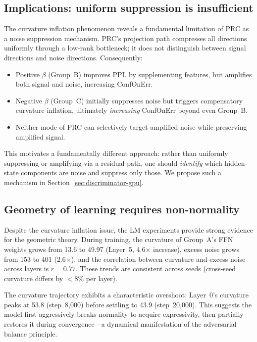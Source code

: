\documentclass[11pt,a4paper]{article}
\theoremstyle{definition}
\begin{document}
\subsection{Implications: uniform suppression is insufficient}

The curvature inflation phenomenon reveals a fundamental
limitation of PRC as a noise suppression mechanism. PRC's
projection path compresses all directions uniformly through a
low-rank bottleneck; it does not distinguish between signal
directions and noise directions. Consequently:
\begin{itemize}[nosep]
  \item Positive $\beta$ (Group~B) improves PPL by supplementing
        features, but amplifies both signal and noise, increasing
        ConfOnErr.
  \item Negative $\beta$ (Group~C) initially suppresses noise but
        triggers compensatory curvature inflation, ultimately
        \emph{increasing} ConfOnErr beyond even Group~B.
  \item Neither mode of PRC can selectively target amplified
        noise while preserving amplified signal.
\end{itemize}

This motivates a fundamentally different approach: rather than
uniformly suppressing or amplifying via a residual path, one
should \emph{identify} which hidden-state components are noise
and suppress only those. We propose such a mechanism in
Section~\ref{sec:discriminator-gpu}.

\subsection{Geometry of learning requires non-normality}

Despite the curvature inflation issue, the LM experiments provide
strong evidence for the geometric theory. During training, the
curvature of Group~A's FFN weights grows from 13.6 to 49.97
(Layer~5, 4.6$\times$ increase), excess noise grows from 153 to
401 (2.6$\times$), and the correlation between curvature and
excess noise across layers is $r = 0.77$. These trends are
consistent across seeds (cross-seed curvature differs by
$<8\%$ per layer).

The curvature trajectory exhibits a characteristic overshoot:
Layer~0's curvature peaks at 53.8 (step~8{,}000) before settling
to 43.9 (step~20{,}000). This suggests the model first
aggressively breaks normality to acquire expressivity, then
partially restores it during convergence---a dynamical
manifestation of the adversarial balance principle.
\end{document}
